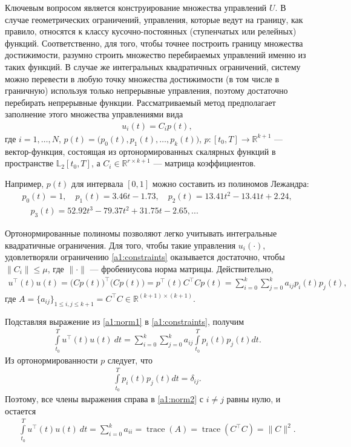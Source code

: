 \documentclass[../main.tex]{subfiles}
\begin{document}
  Ключевым вопросом является конструирование множества управлений $U$.
  В случае геометрических ограничений, управления, которые ведут на границу, как правило, относятся к классу кусочно-постоянных (ступенчатых или релейных) функций.
  Соответственно, для того, чтобы точнее построить границу множества достижимости, разумно строить множество перебираемых управлений именно из таких функций. 
  В случае же интегральных квадратичных ограничений, систему можно перевести в любую точку множества достижимости (в том числе в граничную) используя только непрерывные управления, поэтому достаточно перебирать непрерывные функции. 
  Рассматриваемый метод предполагает заполнение этого множества управлениями вида 
  \begin{gather}\label{a1:control}
  	u_i(t) = C_i p (t),
  \end{gather}
  где $ i = 1, \dots, N$, $p(t) = \big(p_{0}(t),p_{1}(t),\dots,p_{k}(t)\big)$, $p: [t_0, {T}] \rightarrow \mathbb{R}^{k+1} $ --- вектор-функция, состоящая из ортонормированных скалярных функций в пространстве $\mathbb{L}_2[t_0, {T}]$, а $C_i \in \mathbb{R}^{r \times k+1}$ --- матрица коэффициентов. 
	  
  Например, $p(t)$ для интервала $[0,1]$ можно составить из полиномов Лежандра:
  \begin{gather*}
  	p_0(t) = 1, \quad p_1(t) = 3.46t-1.73, \quad p_2(t) = 13.41t^2 - 13.41t + 2.24, \\ \quad 
  	p_3(t) = 52.92t^3 - 79.37t^2+31.75t -2.65, ...
  \end{gather*}
  
  Ортонормированные полиномы позволяют легко учитывать интегральные квадратичные ограничения.
  Для того, чтобы такие управления $u_i(\cdot)$, удовлетворяли ограничению \eqref{a1:constraints} оказывается достаточно, чтобы $\|C_i\| \leqslant \mu$, где $\|\cdot\| $ --- фробениусова норма матрицы.
  Действительно,
  \begin{gather}\label{a1:norm1}
  	 u^{\top}(t) u(t) = \big(C p(t)\big)^{\top} \big(C p(t)\big) = p^{\top}(t) C^{\top} C p(t) = \sum_{i=0}^k \sum_{j=0}^k a_{ij} p_i(t) p_j(t),
  \end{gather}
  где $ A = \{a_{ij}\}_{1\leqslant i,j \leqslant k + 1} = C^{\top} C \in \mathbb{R}^{(k+1) × (k+1)} $.
  
  Подставляя выражение из \eqref{a1:norm1} в \eqref{a1:constraints}, получим
  \begin{gather}\label{a1:norm2}
  		\int\limits_{t_0}^T u^{\top}(t) u(t) \ dt = \sum_{i=0}^k \sum_{j=0}^k a_{ij} \int\limits_{t_0}^T p_i(t) p_j(t) dt.
  \end{gather}
  Из ортонормированности $p$ следует, что 
  \begin{gather}
  	\int\limits_{t_0}^T p_i(t) p_j(t) dt = \delta_{ij}. 
  \end{gather}
  Поэтому, все члены выражения справа в \eqref{a1:norm2}  с $i \neq j$ равны нулю, и остается 
  \begin{gather}
  	\int\limits_{t_0}^T u^{\top}(t) u(t) \ dt =  \sum_{i=0}^k  a_{ii} = \operatorname{trace}(A) = \operatorname{trace}(C^{\top} C) = \| C\|^2.
  \end{gather}
  
\end{document}
